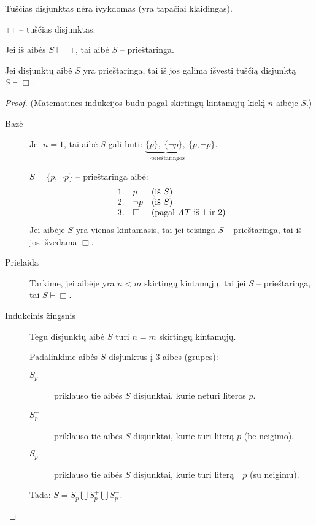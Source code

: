 Tuščias disjunktas nėra įvykdomas (yra tapačiai klaidingas).
\begin{notation}
  $\Box$ – tuščias disjunktas.
\end{notation}

Jei iš aibės $S \vdash \Box$, tai aibė $S$ – prieštaringa.

\begin{prop}
  Jei disjunktų aibė $S$ yra prieštaringa, tai iš jos galima išvesti 
  tuščią disjunktą $S \vdash \Box$.

  \begin{proof}
    (Matematinės indukcijos būdu pagal skirtingų kintamųjų kiekį $n$ 
    aibėje $S$.)

    \begin{description}
      \item[Bazė] Jei $n = 1$, tai aibė $S$ gali būti: 
        $\underbrace{\{p\},\: \{\neg p\},}_{\neg \text{prieštaringos}}%
        \:\{p,\neg p\}$.

        $S = \{p, \neg p\}$ – prieštaringa aibė:
        \[
        \begin{array}{l l l}
          1. & p & (\text{iš }S) \\
          2. & \neg p & (\text{iš }S) \\
          3. & \Box & (\text{pagal \emph{AT} iš 1 ir 2})
        \end{array}
        \]
        Jei aibėje $S$ yra vienas kintamasis, tai jei teisinga 
        $S$ – prieštaringa, tai iš jos išvedama $\Box$.

      \item[Prielaida] Tarkime, jei aibėje yra $n < m$ skirtingų 
        kintamųjų, tai jei $S$ – prieštaringa, tai $S \vdash \Box$.

      \item[Indukcinis žingsnis] Tegu disjunktų aibė $S$ turi $n = m$
        skirtingų kintamųjų.

        Padalinkime aibės $S$ disjunktus į 3 aibes (grupes):
        \begin{description}
          \item[$S_{p}$] priklauso tie aibės $S$ disjunktai, kurie neturi
            literos $p$.
          \item[$S_{p}^{+}$] priklauso tie aibės $S$ disjunktai, kurie turi
            literą $p$ (be neigimo).
          \item[$S_{p}^{-}$] priklauso tie aibės $S$ disjunktai, kurie turi
            literą $\neg p$ (su neigimu).
        \end{description}
        Tada: $S = S_{p} \bigcup S_{p}^{+} \bigcup S_{p}^{-}$.


\end{description}
\end{proof}
\end{prop}
